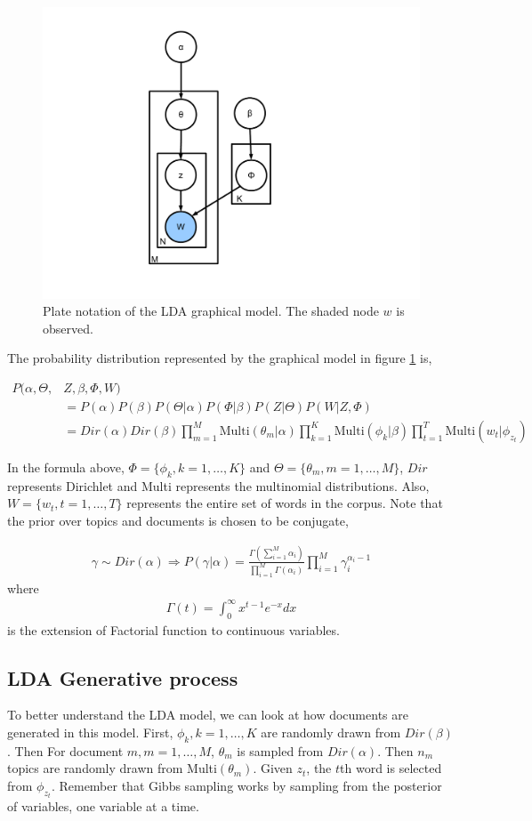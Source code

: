 \documentclass[twoside,12pt]{article}
\begin{document}
\begin{figure}[h!]
\centering
\includegraphics[width=.3\textwidth]{./figs/gm.pdf}
\caption{Plate notation of the LDA graphical model. The shaded node $w$ is observed. }
\label{figGM}
\end{figure}

The probability distribution represented by the graphical model in figure \ref{figGM} is,

\begin{align}
P(\alpha,\Theta,&Z,\beta,\Phi,W)  \\  &=P(\alpha) P(\beta) P(\Theta | \alpha) P(\Phi|\beta) P(Z|\Theta) P(W|Z,\Phi) \\ &= Dir(\alpha) Dir(\beta) \prod_{m=1}^M \text{Multi}(\theta_m | \alpha) \prod_{k=1}^K \text{Multi}(\phi_k | \beta) \prod_{t=1}^T \text{Multi}(w_t | \phi_{z_t})
\end{align}
 
 In the formula above, $\Phi = \{\phi_k, k=1,\ldots,K\}$ and $\Theta=\{\theta_m, m=1,\ldots,M\}$, $Dir$ represents Dirichlet and Multi represents the multinomial distributions. Also, $W = \{w_t, t=1,\ldots,T\}$ represents the entire set of words in the corpus. Note that the prior over topics and documents is chosen to be conjugate,
 
\begin{align}
\gamma \sim Dir(\alpha) \Rightarrow P(\gamma | \alpha) = \frac{\Gamma(\sum_{i=1}^M \alpha_i)}{\prod_{i=1}^M \Gamma(\alpha_i)} \prod_{i=1}^M \gamma_i^{\alpha_i -1} 
\end{align}
where
\begin{align}
\Gamma(t) = \int_0^\infty x^{t-1} e^{-x} dx
\end{align}
is the extension of Factorial function to continuous variables.
\subsection{ LDA Generative process}
To better understand the LDA model, we can look at how documents are generated in this model. First, $\phi_k, k=1,\ldots,K$ are randomly drawn from $Dir(\beta)$. Then For document $m, m=1,\ldots,M$, $\theta_m$ is sampled from $Dir(\alpha)$. Then $n_m$ topics are randomly drawn from Multi$(\theta_m)$. Given $z_t$, the $t$th word is selected from $\phi_{z_t}$. Remember that Gibbs sampling works by sampling from the posterior of variables, one variable at a time. 
\end{document}
